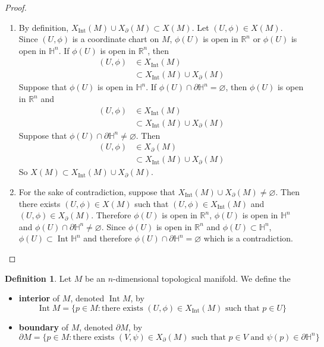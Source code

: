 \documentclass{book}
\theoremstyle{definition}
\newtheorem{defn}[definition]{Definition}
\renewcommand{\H}{\mathbb{H}}
\newcommand{\R}{\mathbb{R}}
\DeclareMathOperator{\Int}{Int}
\DeclareMathOperator*{\0}{\mbf{0}}
\DeclareMathOperator*{\1}{\mbf{1}}
\newcommand{\p}{\partial}
\begin{document}
	\begin{proof}\
		\begin{enumerate}
			\item By definition, $X_{\Int}(M) \cup X_{\p}(M) \subset X(M)$. Let $(U, \phi) \in X(M)$. Since $(U, \phi)$ is a coordinate chart on $M$, $\phi(U)$ is open in $\R^n$ or $\phi(U)$ is open in $\H^n$. If $\phi(U)$ is open in $\R^n$, then 
			\begin{align*}
				(U, \phi) 
				& \in X_{\Int}(M) \\
				& \subset X_{\Int}(M) \cup X_{\p}(M)
			\end{align*}
			Suppose that $\phi(U)$ is open in $\H^n$. If $\phi(U) \cap \p \H^n = \varnothing$, then $\phi(U)$ is open in $\R^n$ and 
			\begin{align*}
				(U, \phi) 
				& \in X_{\Int}(M) \\
				& \subset X_{\Int}(M) \cup X_{\p}(M)
			\end{align*}
			Suppose that $\phi(U) \cap \p \H^n \neq \varnothing$. Then 
			\begin{align*}
				(U, \phi) 
				& \in X_{\p}(M) \\
				& \subset X_{\Int}(M) \cup X_{\p}(M)
			\end{align*}
			So $X(M) \subset X_{\Int}(M) \cup X_{\p}(M)$.
			\item For the sake of contradiction, suppose that $X_{\Int}(M) \cup X_{\p}(M) \neq \varnothing$. Then there exists $(U, \phi) \in X(M)$ such that $(U, \phi) \in X_{\Int}(M)$ and $(U, \phi) \in X_{\p}(M)$. Therefore $\phi(U)$ is open in $\R^n$, $\phi(U)$ is open in $\H^n$ and $\phi(U) \cap \p \H^n \neq \varnothing$. Since $\phi(U)$ is open in $\R^n$ and $\phi(U) \subset \H^n$, $\phi(U) \subset \Int \H^n$ and therefore $\phi(U) \cap \p \H^n = \varnothing$ which is a contradiction.
		\end{enumerate}
	\end{proof}

	\begin{defn} Let $M$ be an $n$-dimensional topological manifold. We define the
		\begin{itemize}
			\item \textbf{interior} of $M$, denoted $\Int M$, by 
			$$\Int M = \{p \in M: \text{there exists $(U, \phi) \in X_{\Int}(M)$ such that $p \in U$}\}$$
			\item \textbf{boundary} of $M$, denoted $\p M$, by 
			$$\p M = \{p \in M: \text{there exists $(V, \psi) \in X_{\p}(M)$ such that $p \in V$ and $\psi(p) \in \p \H^n$}\}$$
		\end{itemize}
	\end{defn}
\end{document}
